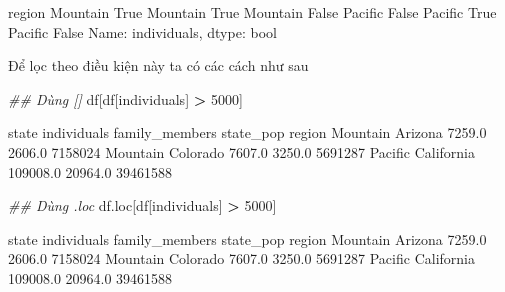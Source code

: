 \documentclass[
]{book}
\newenvironment{Shaded}{\begin{snugshade}}{\end{snugshade}}
\newcommand{\CommentTok}[1]{\textcolor[rgb]{0.56,0.35,0.01}{\textit{#1}}}
\newcommand{\DecValTok}[1]{\textcolor[rgb]{0.00,0.00,0.81}{#1}}
\newcommand{\NormalTok}[1]{#1}
\newcommand{\OperatorTok}[1]{\textcolor[rgb]{0.81,0.36,0.00}{\textbf{#1}}}
\newcommand{\StringTok}[1]{\textcolor[rgb]{0.31,0.60,0.02}{#1}}
\begin{document}
\begin{Shaded}
\begin{Highlighting}[]
\NormalTok{region}
\NormalTok{Mountain     True}
\NormalTok{Mountain     True}
\NormalTok{Mountain    False}
\NormalTok{Pacific     False}
\NormalTok{Pacific      True}
\NormalTok{Pacific     False}
\NormalTok{Name: individuals, dtype: bool}
\end{Highlighting}
\end{Shaded}

Để lọc theo điều kiện này ta có các cách như sau

\begin{Shaded}
\begin{Highlighting}[]
\CommentTok{\#\# Dùng []}
\NormalTok{df[df[}\StringTok{\textquotesingle{}individuals\textquotesingle{}}\NormalTok{] }\OperatorTok{\textgreater{}} \DecValTok{5000}\NormalTok{]}
\end{Highlighting}
\end{Shaded}

\begin{Shaded}
\begin{Highlighting}[]
\NormalTok{               state  individuals  family\_members  state\_pop}
\NormalTok{region                                                      }
\NormalTok{Mountain     Arizona       7259.0          2606.0    7158024}
\NormalTok{Mountain    Colorado       7607.0          3250.0    5691287}
\NormalTok{Pacific   California     109008.0         20964.0   39461588}
\end{Highlighting}
\end{Shaded}

\begin{Shaded}
\begin{Highlighting}[]
\CommentTok{\#\# Dùng .loc}
\NormalTok{df.loc[df[}\StringTok{\textquotesingle{}individuals\textquotesingle{}}\NormalTok{] }\OperatorTok{\textgreater{}} \DecValTok{5000}\NormalTok{]}
\end{Highlighting}
\end{Shaded}

\begin{Shaded}
\begin{Highlighting}[]
\NormalTok{               state  individuals  family\_members  state\_pop}
\NormalTok{region                                                      }
\NormalTok{Mountain     Arizona       7259.0          2606.0    7158024}
\NormalTok{Mountain    Colorado       7607.0          3250.0    5691287}
\NormalTok{Pacific   California     109008.0         20964.0   39461588}
\end{Highlighting}
\end{Shaded}
\end{document}
